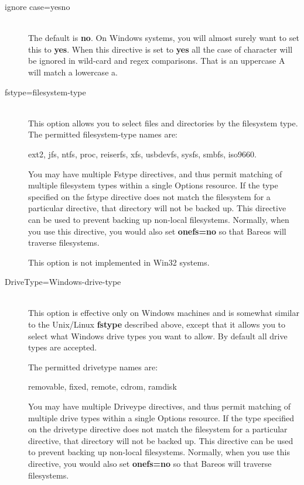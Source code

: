 \begin{description}
\item [ignore case=yes{\textbar}no] \hfill \\
   The default is {\bf no}.  On Windows systems, you will almost surely
   want to set this to {\bf yes}.  When this directive is set to {\bf yes}
   all the case of character will be ignored in wild-card and regex
   comparisons.  That is an uppercase A will match a lowercase a.

\item [fstype=filesystem-type] \hfill \\
   This option allows you to select files and directories by the
   filesystem type.  The permitted filesystem-type names are:

   ext2, jfs, ntfs, proc, reiserfs, xfs, usbdevfs, sysfs, smbfs,
   iso9660.

   You may have multiple Fstype directives, and thus permit matching
   of multiple filesystem types within a single Options resource.  If
   the type specified on the fstype directive does not match the
   filesystem for a particular directive, that directory will not be
   backed up.  This directive can be used to prevent backing up
   non-local filesystems. Normally, when you use this directive, you
   would also set {\bf onefs=no} so that Bareos will traverse filesystems.

   This option is not implemented in Win32 systems.

\item [DriveType=Windows-drive-type] \hfill \\
   This option is effective only on Windows machines and is
   somewhat similar to the Unix/Linux {\bf fstype} described
   above, except that it allows you to select what Windows
   drive types you want to allow.  By default all drive
   types are accepted.

   The permitted drivetype names are:

   removable, fixed, remote, cdrom, ramdisk

   You may have multiple Driveype directives, and thus permit matching
   of multiple drive types within a single Options resource.  If
   the type specified on the drivetype directive does not match the
   filesystem for a particular directive, that directory will not be
   backed up.  This directive can be used to prevent backing up
   non-local filesystems. Normally, when you use this directive, you
   would also set {\bf onefs=no} so that Bareos will traverse filesystems.


\end{description}
